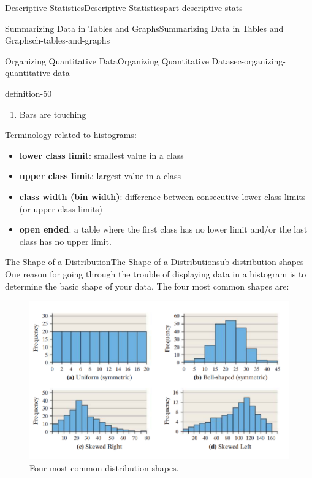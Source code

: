 \documentclass[oneside,10pt,]{book}
\newcommand{\terminology}[1]{\textbf{#1}}
\numberwithin{equation}{section}
\begin{document}
\begin{partptx}{Descriptive Statistics}{}{Descriptive Statistics}{}{}{part-descriptive-stats}
\begin{chapterptx}{Summarizing Data in Tables and Graphs}{}{Summarizing Data in Tables and Graphs}{}{}{ch-tables-and-graphs}
\begin{sectionptx}{Organizing Quantitative Data}{}{Organizing Quantitative Data}{}{}{sec-organizing-quantitative-data}
\begin{definition}{}{definition-50}
\begin{enumerate}
\item\hypertarget{li-22}{}Bars are touching%
\end{enumerate}
%
\par
\hypertarget{p-48}{}%
Terminology related to histograms:\leavevmode%
\begin{itemize}[label=\textbullet]
\item{}\terminology{lower class limit}: smallest value in a class%
\item{}\terminology{upper class limit}: largest value in a class%
\item{}\terminology{class width (bin width)}: difference between consecutive lower class limits (or upper class limits)%
\item{}\terminology{open ended}: a table where the first class has no lower limit and\slash{}or the last class has no upper limit.%
\end{itemize}
%
\end{definition}
%
%
\typeout{************************************************}
\typeout{************************************************}
%
\begin{subsectionptx}{The Shape of a Distribution}{}{The Shape of a Distribution}{}{}{sub-distribution-shapes}
\hypertarget{p-49}{}%
One reason for going through the trouble of displaying data in a histogram is to determine the basic shape of your data. The four most common shapes are:%
\begin{figure}
\centering
\includegraphics[width=0.8\linewidth]{images/four-distribution-shapes.png}
\caption{Four most common distribution shapes.\label{figure-6}}
\end{figure}
\end{subsectionptx}
%
%
\typeout{************************************************}

\end{sectionptx}
\end{chapterptx}
\end{partptx}
\end{document}
